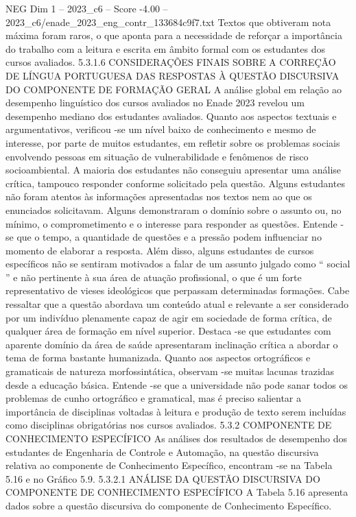 \begin{textsample}{NEG Dim 1 – 2023\_c6 – Score -4.00 – 2023\_c6/enade\_2023\_eng\_contr\_133684c9f7.txt}
Textos que obtiveram nota máxima foram raros, o que aponta para a necessidade de reforçar a importância do trabalho com a leitura e escrita em âmbito formal com os estudantes dos cursos avaliados. 5.3.1.6 CONSIDERAÇÕES FINAIS SOBRE A CORREÇÃO DE LÍNGUA PORTUGUESA DAS RESPOSTAS À QUESTÃO DISCURSIVA DO COMPONENTE DE FORMAÇÃO GERAL A análise global em relação ao desempenho linguístico dos cursos avaliados no Enade 2023 revelou um desempenho mediano dos estudantes avaliados.
Quanto aos aspectos textuais e argumentativos, verificou -se um nível baixo de conhecimento e mesmo de interesse, por parte de muitos estudantes, em refletir sobre os problemas sociais envolvendo pessoas em situação de vulnerabilidade e fenômenos de risco socioambiental.
A maioria dos estudantes não conseguiu apresentar uma análise crítica, tampouco responder conforme solicitado pela questão.
Alguns estudantes não foram atentos às informações apresentadas nos textos nem ao que os enunciados solicitavam.
Alguns demonstraram o domínio sobre o assunto ou, no mínimo, o comprometimento e o interesse para responder as questões.
Entende -se que o tempo, a quantidade de questões e a pressão podem influenciar no momento de elaborar a resposta.
Além disso, alguns estudantes de cursos específicos não se sentiram motivados a falar de um assunto julgado como “ social ” e não pertinente à sua área de atuação profissional, o que é um forte representativo de vieses ideológicos que perpassam determinadas formações.
Cabe ressaltar que a questão abordava um conteúdo atual e relevante a ser considerado por um indivíduo plenamente capaz de agir em sociedade de forma crítica, de qualquer área de formação em nível superior.
Destaca -se que estudantes com aparente domínio da área de saúde apresentaram inclinação crítica a abordar o tema de forma bastante humanizada.
Quanto aos aspectos ortográficos e gramaticais de natureza morfossintática, observam -se muitas lacunas trazidas desde a educação básica.
Entende -se que a universidade não pode sanar todos os problemas de cunho ortográfico e gramatical, mas é preciso salientar a importância de disciplinas voltadas à leitura e produção de texto serem incluídas como disciplinas obrigatórias nos cursos avaliados. 5.3.2 COMPONENTE DE CONHECIMENTO ESPECÍFICO As análises dos resultados de desempenho dos estudantes de Engenharia de Controle e Automação, na questão discursiva relativa ao componente de Conhecimento Específico, encontram -se na Tabela 5.16 e no Gráfico 5.9. 5.3.2.1 ANÁLISE DA QUESTÃO DISCURSIVA DO COMPONENTE DE CONHECIMENTO ESPECÍFICO A Tabela 5.16 apresenta dados sobre a questão discursiva do componente de Conhecimento Específico.

\end{textsample}
